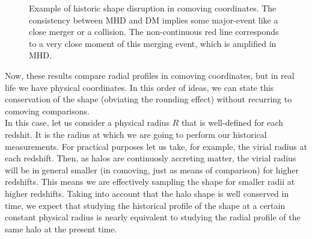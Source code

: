 \begin{figure}[!ht]
  \centering
  \hfill
  \caption{Example of historic shape disruption in comoving coordinates. The consistency between MHD and DM implies some major-event like a close merger or a collision. The non-continuous red line corresponds to a very close moment of this merging event, which is amplified in MHD.}
  \label{fig:RedshiftBad}
\end{figure}

Now, these results compare radial profiles in comoving coordinates, but in real life we have physical coordinates. In this order of ideas, we can state this conservation of the shape (obviating the rounding effect) without recurring to comoving comparisons.\\

In this case, let us consider a physical radius $R$ that is well-defined for each redshit. It is the radius at which we are going to perform our historical measurements. For practical purposes let us take, for example, the virial radius at each redshift. Then, as halos are continuosly accreting matter, the virial radius will be in general smaller (in comoving, just as means of comparison) for higher redshifts. This means we are effectively sampling the shape for smaller radii at higher redshifts. Taking into account that the halo shape is well conserved in time, we expect that studying the historical profile of the shape at a certain constant physical radius is nearly equivalent to studying the radial profile of the same halo at the present time. \\

